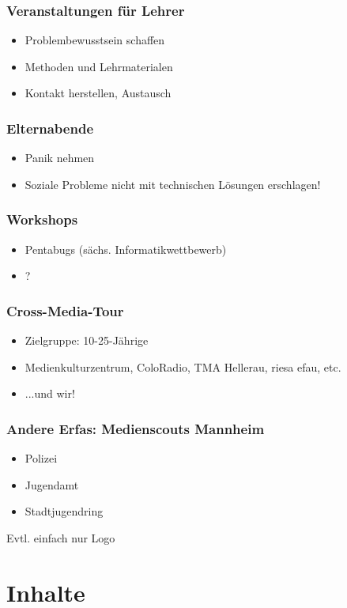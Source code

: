 \documentclass[12pt]{beamer}
\begin{document}
\begin{frame}
  \frametitle{Veranstaltungen für Lehrer}
  \begin{itemize}
    \item Problembewusstsein schaffen
    \item Methoden und Lehrmaterialen
    \item Kontakt herstellen, Austausch
  \end{itemize}
\end{frame}

\begin{frame}
  \frametitle{Elternabende}
  \begin{itemize}
    \item Panik nehmen
    \item Soziale Probleme nicht mit technischen Lösungen erschlagen!
  \end{itemize}
\end{frame}

\begin{frame}
  \frametitle{Workshops}
  \begin{itemize}
    \item Pentabugs (sächs. Informatikwettbewerb)
    \item ?
  \end{itemize}
\end{frame}

\begin{frame}
  \frametitle{Cross-Media-Tour}
  \begin{itemize}
    \item Zielgruppe: 10-25-Jährige
    \item Medienkulturzentrum, ColoRadio, TMA Hellerau, riesa efau, etc.
    \item ...und wir!
  \end{itemize}
\end{frame}

\begin{frame}
  \frametitle{Andere Erfas: Medienscouts Mannheim}
  \begin{itemize}
    \item Polizei
    \item Jugendamt
    \item Stadtjugendring
  \end{itemize}
  Evtl. einfach nur Logo
\end{frame}

\section{Inhalte}
\end{document}
